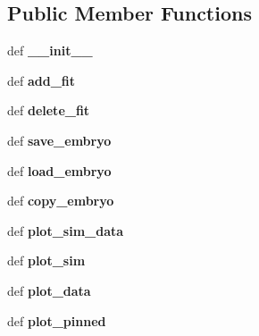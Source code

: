 \subsection*{Public Member Functions}
\begin{DoxyCompactItemize}
\item 
\hypertarget{classembryo_1_1embryo_a8c9736e06943eea20e74b4e25d756e13}{def {\bfseries \+\_\+\+\_\+init\+\_\+\+\_\+}}\label{classembryo_1_1embryo_a8c9736e06943eea20e74b4e25d756e13}

\item 
\hypertarget{classembryo_1_1embryo_aa71724b2ec914d05d54b14e56098e61e}{def {\bfseries add\+\_\+fit}}\label{classembryo_1_1embryo_aa71724b2ec914d05d54b14e56098e61e}

\item 
\hypertarget{classembryo_1_1embryo_a8b50dcd5b39f71114fb69d44481cb70f}{def {\bfseries delete\+\_\+fit}}\label{classembryo_1_1embryo_a8b50dcd5b39f71114fb69d44481cb70f}

\item 
\hypertarget{classembryo_1_1embryo_aaba3a8802e16a4c3f8a5f180cc19e0c2}{def {\bfseries save\+\_\+embryo}}\label{classembryo_1_1embryo_aaba3a8802e16a4c3f8a5f180cc19e0c2}

\item 
\hypertarget{classembryo_1_1embryo_a05834667f02080c3bfb8ba384f881dac}{def {\bfseries load\+\_\+embryo}}\label{classembryo_1_1embryo_a05834667f02080c3bfb8ba384f881dac}

\item 
\hypertarget{classembryo_1_1embryo_a98ae93640d31c33028a6878ae582af3c}{def {\bfseries copy\+\_\+embryo}}\label{classembryo_1_1embryo_a98ae93640d31c33028a6878ae582af3c}

\item 
\hypertarget{classembryo_1_1embryo_af072b0a2ceb5f4b5a93ea8e9c67eabab}{def {\bfseries plot\+\_\+sim\+\_\+data}}\label{classembryo_1_1embryo_af072b0a2ceb5f4b5a93ea8e9c67eabab}

\item 
\hypertarget{classembryo_1_1embryo_a5c224095aa2cf3b212cc9065579be0ee}{def {\bfseries plot\+\_\+sim}}\label{classembryo_1_1embryo_a5c224095aa2cf3b212cc9065579be0ee}

\item 
\hypertarget{classembryo_1_1embryo_a17341daad9b3f77786f11dc815973e73}{def {\bfseries plot\+\_\+data}}\label{classembryo_1_1embryo_a17341daad9b3f77786f11dc815973e73}

\item 
\hypertarget{classembryo_1_1embryo_a37e80c2f0f215104b4d0de83c2afdbee}{def {\bfseries plot\+\_\+pinned}}\label{classembryo_1_1embryo_a37e80c2f0f215104b4d0de83c2afdbee}


\end{DoxyCompactItemize}
